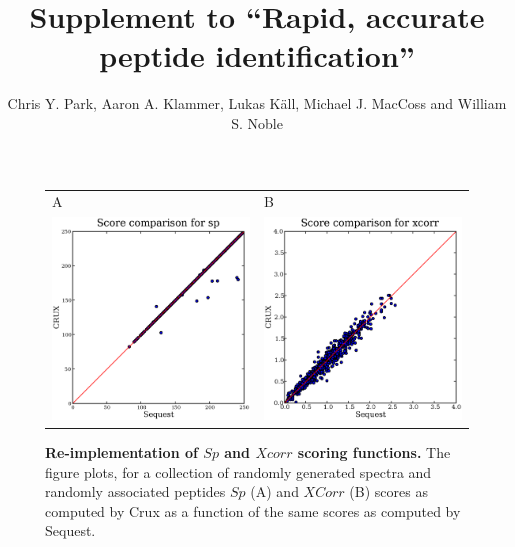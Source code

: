 \documentclass{article}
\begin{document}
\title{Supplement to ``Rapid, accurate peptide identification''}

\author{Chris Y. Park, Aaron A. Klammer, Lukas K\"{a}ll, Michael J. MacCoss
and William S. Noble}

\maketitle

\begin{figure}
  \centering
  \begin{tabular}{ll}
    {\sf A} & {\sf B} \\
    \includegraphics[width=2.5in]{../../results/paper-figure/second-score/fig-2-random-sp.eps} &
    \includegraphics[width=2.5in]{../../results/paper-figure/second-score/fig-2-random-xcorr.eps} \\
  \end{tabular}
  \caption{{\bf Re-implementation of $Sp$ and $Xcorr$ scoring functions.}
  The figure plots, for a collection of randomly generated spectra and
  randomly associated peptides 
  $Sp$ ({\sf A}) and $XCorr$ ({\sf B}) scores as computed by Crux as a function of the
  same scores as computed by {\sc Sequest}. 
  \label{figure:sp-xcorr-random}}
\end{figure}
\end{document}
